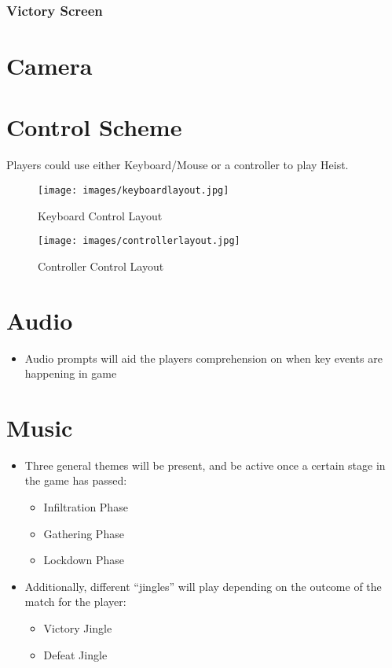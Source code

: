 \documentclass[10pt]{report}
\begin{document}
\subsubsection{Victory Screen}

\section{Camera}


\section{Control Scheme}

Players could use either Keyboard/Mouse or a controller to play Heist.

\begin{figure}[H]
	\texttt{[image: images/keyboardlayout.jpg]}
    \caption{Keyboard Control Layout}
\end{figure}

\begin{figure}[H]
	\texttt{[image: images/controllerlayout.jpg]}
    \caption{Controller Control Layout}
\end{figure}

\section{Audio}

\begin{itemize}
    \item Audio prompts will aid the players comprehension on when key events are happening in game
\end{itemize}

\section{Music}

\begin{itemize}
    \item Three general themes will be present, and be active once a certain stage in the game has passed:
    \begin{itemize}
        \item Infiltration Phase
        \item Gathering Phase
        \item Lockdown Phase
    \end{itemize}
    \item Additionally, different “jingles” will play depending on the outcome of the match for the player:
    \begin{itemize}
        \item Victory Jingle
        \item Defeat Jingle
    \end{itemize}
\end{itemize}
\end{document}
